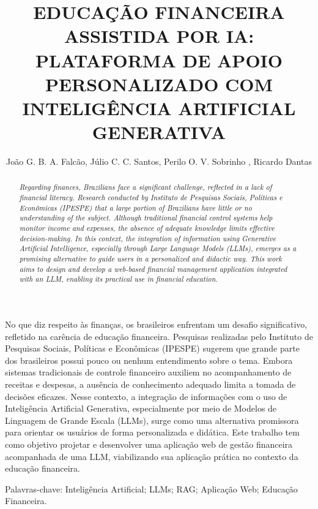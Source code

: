 \documentclass[12pt]{article}
\begin{document}
 


     
\sloppy

\title{EDUCAÇÃO FINANCEIRA ASSISTIDA POR IA: PLATAFORMA DE APOIO PERSONALIZADO COM INTELIGÊNCIA ARTIFICIAL GENERATIVA}

\author{João G. B. A. Falcão, Júlio C. C. Santos, Perilo O. V. Sobrinho , Ricardo Dantas }

\address{Ciência da Computação – Centro Universitário de João Pessoa (UNIPÊ) \\
João Pessoa – PB – Brasil
}


\maketitle

\begin{resumo} 
  No que diz respeito às finanças, os brasileiros enfrentam um desafio significativo, refletido na carência de educação financeira. Pesquisas realizadas pelo Instituto de Pesquisas Sociais, Políticas e Econômicas (IPESPE) sugerem que grande parte dos brasileiros possui pouco ou nenhum entendimento sobre o tema. Embora sistemas tradicionais de controle financeiro auxiliem no acompanhamento de receitas e despesas, a ausência de conhecimento adequado limita a tomada de decisões eficazes. Nesse contexto, a integração de informações com o uso de Inteligência Artificial Generativa, especialmente por meio de Modelos de Linguagem de Grande Escala (LLMs), surge como uma alternativa promissora para orientar os usuários de forma personalizada e didática. Este trabalho tem como objetivo projetar e desenvolver uma aplicação web de gestão financeira acompanhada de uma LLM, viabilizando sua aplicação prática no contexto da educação financeira.

  Palavras-chave: Inteligência Artificial; LLMs; RAG; Aplicação Web; Educação Financeira.
\end{resumo}

\begin{abstract}
  \textit{Regarding finances, Brazilians face a significant challenge, 
  reflected in a lack of financial literacy. Research conducted by Instituto de Pesquisas Sociais, Políticas e Econômicas (IPESPE) that a large portion of Brazilians have little or no understanding of the subject. Although traditional financial control systems help monitor income and expenses, the absence of adequate knowledge limits effective decision-making. In this context, the integration of information using Generative Artificial Intelligence, especially through Large Language Models (LLMs), emerges as a promising alternative to guide users in a personalized and didactic way. This work aims to design and develop a web-based financial management application integrated with an LLM, enabling its practical use in financial education.}
\end{abstract}
\end{document}
